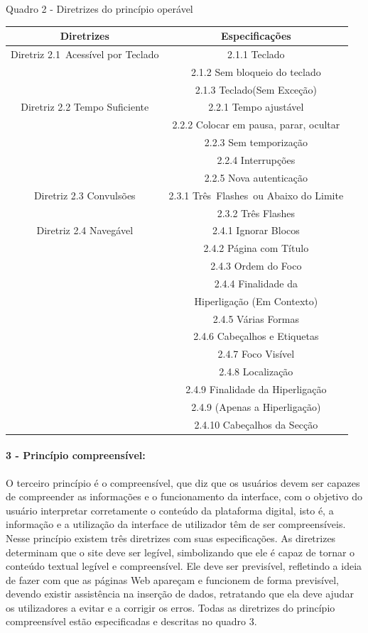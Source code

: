 \documentclass[a4paper]{article}
\begin{document}
\begin{titlepage}
Quadro 2 - Diretrizes do princípio operável\\[-1cm]
\begin{center}
	\fontsize{8pt}{8pt}\selectfont
	\begin{longtable}{|c|c|}
		\hline
		Diretrizes & Especificações \\
		\hline
		Diretriz 2.1 Acessível por Teclado& 2.1.1 Teclado\\
		& 2.1.2 Sem bloqueio do teclado\\
		& 2.1.3 Teclado(Sem Exceção)\\
		\hline
		Diretriz 2.2 Tempo Suficiente & 2.2.1 Tempo ajustável \\
		& 2.2.2 Colocar em pausa, parar, ocultar\\
		& 2.2.3 Sem temporização\\
		& 2.2.4 Interrupções\\
		& 2.2.5 Nova autenticação\\
		\hline
		Diretriz 2.3 Convulsões& 2.3.1 Três Flashes ou Abaixo do Limite\\
		& 2.3.2 Três Flashes\\
		\hline
		Diretriz 2.4 Navegável& 2.4.1 Ignorar Blocos\\
		& 2.4.2 Página com Título\\
		& 2.4.3 Ordem do Foco\\
		& 2.4.4 Finalidade da\\
		& Hiperligação (Em Contexto)\\
		& 2.4.5 Várias Formas\\
		& 2.4.6 Cabeçalhos e Etiquetas\\
		& 2.4.7 Foco Visível\\
		& 2.4.8 Localização\\
		& 2.4.9 Finalidade da Hiperligação\\
		& 2.4.9 (Apenas a Hiperligação)\\
		& 2.4.10 Cabeçalhos da Secção\\
		\hline
	\end{longtable}
\end{center}

\paragraph{3 - Princípio compreensível: }

O terceiro princípio é o compreensível, que diz que os usuários devem ser capazes de compreender as informações e o funcionamento da interface, com o objetivo do usuário interpretar corretamente o conteúdo da plataforma digital, isto é, a informação e a utilização da interface de utilizador têm de ser compreensíveis. Nesse princípio existem três diretrizes com suas especificações. As diretrizes determinam que o site deve ser legível, simbolizando que ele é capaz de tornar o conteúdo textual legível e compreensível. Ele deve ser previsível, refletindo a ideia de fazer com que as páginas Web apareçam e funcionem de forma previsível, devendo existir assistência na inserção de dados, retratando que ela deve ajudar os utilizadores a evitar e a corrigir os erros. Todas as diretrizes do princípio compreensível estão especificadas e descritas no quadro 3.


\end{titlepage}
\end{document}
